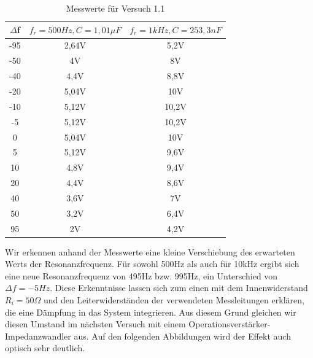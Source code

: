 \documentclass{article}
\begin{document}
\begin{table}[h]
  \begin{center}

    \begin{tabular}{|c|c|c|}
      \hline
      $\Delta$f & $f_r = 500Hz, C=1,01\mu F$ & $f_r = 1kHz, C= 253,3 nF$ \\
      \hline
      -95       & 2,64V                      & 5,2V                      \\
      \hline
      -50       & 4V                         & 8V                        \\
      \hline
      -40       & 4,4V                       & 8,8V                      \\
      \hline
      -20       & 5,04V                      & 10V                       \\
      \hline
      -10       & 5,12V                      & 10,2V                     \\
      \hline
      -5        & 5,12V                      & 10,2V                     \\
      \hline
      0         & 5,04V                      & 10V                       \\
      \hline
      5         & 5,12V                      & 9,6V                      \\
      \hline
      10        & 4,8V                       & 9,4V                      \\
      \hline
      20        & 4,4V                       & 8,6V                      \\
      \hline
      40        & 3,6V                       & 7V                        \\
      \hline
      50        & 3,2V                       & 6,4V                      \\
      \hline
      95        & 2V                         & 4,2V                      \\
      \hline
    \end{tabular}
    \caption{Messwerte für Versuch 1.1}
    \label{tab:MV}
  \end{center}
\end{table}

Wir erkennen anhand der Messwerte eine kleine Verschiebung des erwarteten Werts der Resonanzfrequenz. Für sowohl 500Hz als auch für 10kHz
ergibt sich eine neue Resonanzfrequenz von 495Hz bzw. 995Hz, ein Unterschied von $\Delta f = -5Hz$. Diese Erkenntnisse lassen sich zum einen
mit dem Innenwiderstand $R_i = 50\Omega$ und den Leiterwiderständen der verwendeten Messleitungen erklären, die eine Dämpfung in das System integrieren.
Aus diesem Grund gleichen wir diesen Umstand im nächsten Versuch mit einem Operationsverstärker-Impedanzwandler aus. Auf den folgenden Abbildungen wird der Effekt auch
optisch sehr deutlich.
\end{document}
